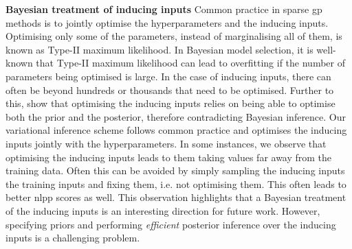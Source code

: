 \documentclass{mimosis-class/mimosis}
\numberwithin{equation}{chapter}
\begin{document}
{\textbf{Bayesian treatment of inducing inputs}
Common practice in sparse \acrshort{gp} methods is to jointly optimise the hyperparameters and the inducing inputs.
Optimising only some of the parameters, instead of marginalising all of them, is known as Type-II maximum likelihood.
In Bayesian model selection, it is well-known that Type-II maximum likelihood can lead to overfitting
if the number of parameters being optimised is large.
In the case of inducing inputs, there can often be beyond hundreds or thousands that need to be optimised.
Further to this, \cite{rossiSparse2021} show that optimising the inducing inputs
relies on being able to optimise both the prior and the posterior, therefore contradicting Bayesian inference.
Our variational inference scheme follows common practice and optimises the inducing inputs
jointly with the hyperparameters.
In some instances, we observe that optimising the inducing inputs leads to them taking values far away from the
training data.
Often this can be avoided by simply sampling the inducing inputs the training inputs and fixing them, i.e. not optimising them.
This often leads to better \acrshort{nlpp} scores as well.
This observation highlights that a Bayesian treatment of the inducing inputs is an interesting direction for future work.
However, specifying priors and performing \emph{efficient} posterior inference over the inducing inputs
is a challenging problem.


}
\end{document}
